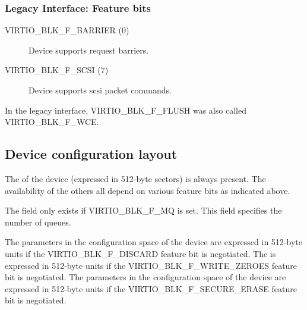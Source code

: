\subsubsection{Legacy Interface: Feature bits}\label{sec:Device Types / Block Device / Feature bits / Legacy Interface: Feature bits}

\begin{description}
\item[VIRTIO_BLK_F_BARRIER (0)] Device supports request barriers.

\item[VIRTIO_BLK_F_SCSI (7)] Device supports scsi packet commands.
\end{description}

\begin{note}
  In the legacy interface, VIRTIO_BLK_F_FLUSH was also
  called VIRTIO_BLK_F_WCE.
\end{note}

\subsection{Device configuration layout}\label{sec:Device Types / Block Device / Device configuration layout}

The  of the device (expressed in 512-byte sectors) is always
present. The availability of the others all depend on various feature
bits as indicated above.

The field  only exists if VIRTIO_BLK_F_MQ is set. This field specifies
the number of queues.

The parameters in the configuration space of the device 
 are expressed in 512-byte units if the
VIRTIO_BLK_F_DISCARD feature bit is negotiated. The 
is expressed in 512-byte units if the VIRTIO_BLK_F_WRITE_ZEROES feature
bit is negotiated. The parameters in the configuration space of the device
  are expressed
in 512-byte units if the VIRTIO_BLK_F_SECURE_ERASE feature bit is negotiated.


